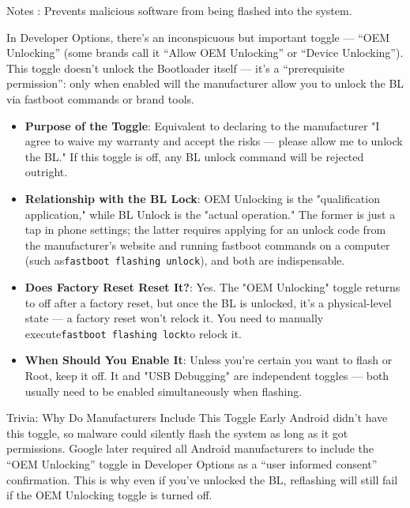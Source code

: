\begin{tcbwarn}{Notes}
: Prevents malicious software from being flashed into the system.

\end{tcbwarn}


In Developer Options, there's an inconspicuous but important toggle — “OEM Unlocking” (some brands call it “Allow OEM Unlocking” or “Device Unlocking”). This toggle doesn't unlock the Bootloader itself — it's a “prerequisite permission”: only when enabled will the manufacturer allow you to unlock the BL via fastboot commands or brand tools.

\begin{itemize}
  \item \textbf{Purpose of the Toggle}: Equivalent to declaring to the manufacturer "I agree to waive my warranty and accept the risks — please allow me to unlock the BL." If this toggle is off, any BL unlock command will be rejected outright.
  \item \textbf{Relationship with the BL Lock}: OEM Unlocking is the "qualification application," while BL Unlock is the "actual operation." The former is just a tap in phone settings; the latter requires applying for an unlock code from the manufacturer's website and running fastboot commands on a computer (such as\texttt{fastboot flashing unlock}), and both are indispensable.
  \item \textbf{Does Factory Reset Reset It?}: Yes. The "OEM Unlocking" toggle returns to off after a factory reset, but once the BL is unlocked, it's a physical-level state — a factory reset won't relock it. You need to manually execute\texttt{fastboot flashing lock}to relock it.
  \item \textbf{When Should You Enable It}: Unless you're certain you want to flash or Root, keep it off. It and "USB Debugging" are independent toggles — both usually need to be enabled simultaneously when flashing.
\end{itemize}

\begin{tcbinfo}{Trivia: Why Do Manufacturers Include This Toggle}
Early Android didn't have this toggle, so malware could silently flash the system as long as it got permissions. Google later required all Android manufacturers to include the “OEM Unlocking” toggle in Developer Options as a “user informed consent” confirmation. This is why even if you've unlocked the BL, reflashing will still fail if the OEM Unlocking toggle is turned off.

\end{tcbinfo}

